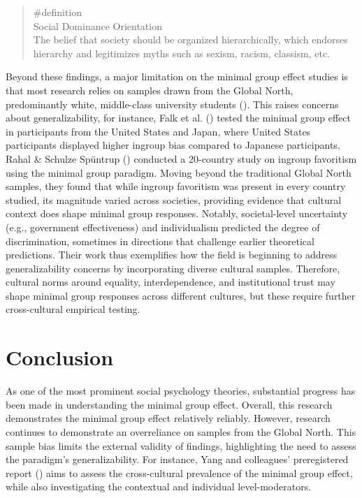\documentclass[
  letterpaper,
]{book}
\begin{document}
\begin{quote}
\label{def-sdo}{\#definition}\\
Social Dominance Orientation\\
The belief that society should be organized hierarchically, which
endorses hierarchy and legitimizes myths such as sexism, racism,
classism, etc.
\end{quote}

Beyond these findings, a major limitation on the minimal group effect
studies is that most research relies on samples drawn from the Global
North, predominantly white, middle-class university students
(). This
raises concerns about generalizability, for instance, Falk et al.
() tested the minimal group
effect in participants from the United States and Japan, where United
States participants displayed higher ingroup bias compared to Japanese
participants. Rahal \& Schulze Spüntrup
() conducted a 20-country study
on ingroup favoritism using the minimal group paradigm. Moving beyond
the traditional Global North samples, they found that while ingroup
favoritism was present in every country studied, its magnitude varied
across societies, providing evidence that cultural context does shape
minimal group responses. Notably, societal-level uncertainty (e.g.,
government effectiveness) and individualism predicted the degree of
discrimination, sometimes in directions that challenge earlier
theoretical predictions. Their work thus exemplifies how the field is
beginning to address generalizability concerns by incorporating diverse
cultural samples. Therefore, cultural norms around equality,
interdependence, and institutional trust may shape minimal group
responses across different cultures, but these require further
cross-cultural empirical testing.

\section{Conclusion}\label{conclusion-16}

As one of the most prominent social psychology theories, substantial
progress has been made in understanding the minimal group effect.
Overall, this research demonstrates the minimal group effect relatively
reliably. However, research continues to demonstrate an overreliance on
samples from the Global North. This sample bias limits the external
validity of findings, highlighting the need to assess the paradigm's
generalizability. For instance, Yang and colleagues' preregistered
report () aims to
assess the cross-cultural prevalence of the minimal group effect, while
also investigating the contextual and individual level-moderators.
\end{document}
